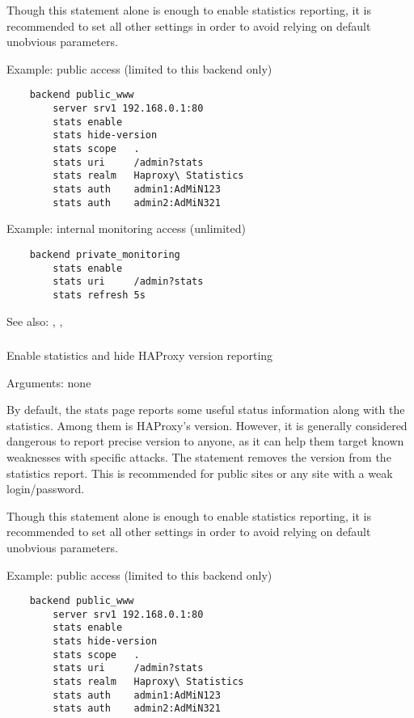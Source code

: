   Though this statement alone is enough to enable statistics reporting, it is
  recommended to set all other settings in order to avoid relying on default
  unobvious parameters.

  Example: public access (limited to this backend only)
  \begin{verbatim}
    backend public_www
        server srv1 192.168.0.1:80
        stats enable
        stats hide-version
        stats scope   .
        stats uri     /admin?stats
        stats realm   Haproxy\ Statistics
        stats auth    admin1:AdMiN123
        stats auth    admin2:AdMiN321
  \end{verbatim}
  
  Example: internal monitoring access (unlimited)
  \begin{verbatim}
    backend private_monitoring
        stats enable
        stats uri     /admin?stats
        stats refresh 5s
  \end{verbatim}


See also: , , 


\subsubsection[stats hide-version]{}

  Enable statistics and hide HAProxy version reporting
 
 
  Arguments: none

  By default, the stats page reports some useful status information along with
  the statistics. Among them is HAProxy's version. However, it is generally
  considered dangerous to report precise version to anyone, as it can help them
  target known weaknesses with specific attacks. The 
  statement removes the version from the statistics report. This is recommended
  for public sites or any site with a weak login/password.

  Though this statement alone is enough to enable statistics reporting, it is
  recommended to set all other settings in order to avoid relying on default
  unobvious parameters.

  Example: public access (limited to this backend only)
  \begin{verbatim}
    backend public_www
        server srv1 192.168.0.1:80
        stats enable
        stats hide-version
        stats scope   .
        stats uri     /admin?stats
        stats realm   Haproxy\ Statistics
        stats auth    admin1:AdMiN123
        stats auth    admin2:AdMiN321
   \end{verbatim}

